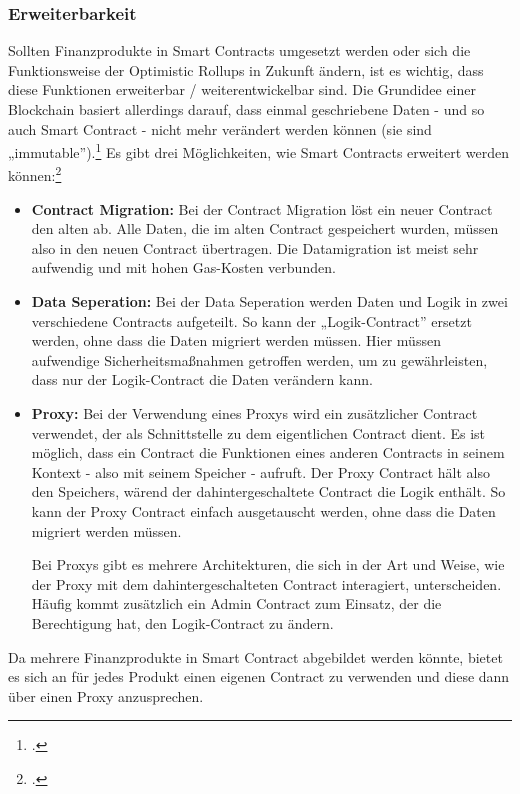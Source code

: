 \subsubsection{Erweiterbarkeit}
\label{sec:Erweiterbarkeit}

Sollten Finanzprodukte in Smart Contracts umgesetzt werden oder sich die Funktionsweise der Optimistic Rollups in Zukunft ändern, ist es wichtig, dass diese Funktionen erweiterbar / weiterentwickelbar sind.
Die Grundidee einer Blockchain basiert allerdings darauf, dass einmal geschriebene Daten - und so auch Smart Contract - nicht mehr verändert werden können (sie sind „immutable”).\footcite[Vgl.][]{w30}
Es gibt drei Möglichkeiten, wie Smart Contracts erweitert werden können:\footcite[Vgl. hierzu und zum Folgenden sowie weiterführend][]{w29}
\begin{itemize}
    \item \textbf{Contract Migration:}
    Bei der Contract Migration löst ein neuer Contract den alten ab.
    Alle Daten, die im alten Contract gespeichert wurden, müssen also in den neuen Contract übertragen.
    Die Datamigration ist meist sehr aufwendig und mit hohen Gas-Kosten verbunden.

    \item \textbf{Data Seperation:}
    Bei der Data Seperation werden Daten und Logik in zwei verschiedene Contracts aufgeteilt.
    So kann der „Logik-Contract” ersetzt werden, ohne dass die Daten migriert werden müssen.
    Hier müssen aufwendige Sicherheitsmaßnahmen getroffen werden, um zu gewährleisten, dass nur der Logik-Contract die Daten verändern kann.

    \item \textbf{Proxy:}
    Bei der Verwendung eines Proxys wird ein zusätzlicher Contract verwendet, der als Schnittstelle zu dem eigentlichen Contract dient.
    Es ist möglich, dass ein Contract die Funktionen eines anderen Contracts in seinem Kontext - also mit seinem Speicher - aufruft.
    Der Proxy Contract hält also den Speichers, wärend der dahintergeschaltete Contract die Logik enthält.
    So kann der Proxy Contract einfach ausgetauscht werden, ohne dass die Daten migriert werden müssen.

    \noindent
    Bei Proxys gibt es mehrere Architekturen, die sich in der Art und Weise, wie der Proxy mit dem dahintergeschalteten Contract interagiert, unterscheiden.
    Häufig kommt zusätzlich ein Admin Contract zum Einsatz, der die Berechtigung hat, den Logik-Contract zu ändern.
\end{itemize}

\noindent
Da mehrere Finanzprodukte in Smart Contract abgebildet werden könnte, bietet es sich an für jedes Produkt einen eigenen Contract zu verwenden und diese dann über einen Proxy anzusprechen.